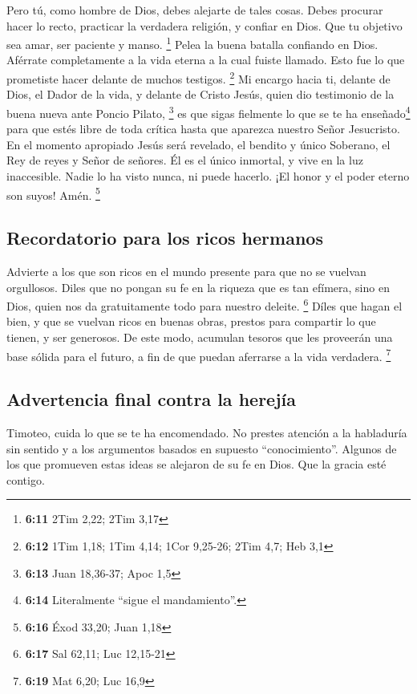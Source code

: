  Pero tú, como hombre de Dios, debes alejarte de tales
cosas. Debes procurar hacer lo recto, practicar la verdadera religión, y
confiar en Dios. Que tu objetivo sea amar, ser paciente y manso.
\footnote{\textbf{6:11} 2Tim 2,22; 2Tim 3,17}  Pelea la
buena batalla confiando en Dios. Aférrate completamente a la vida eterna
a la cual fuiste llamado. Esto fue lo que prometiste hacer delante de
muchos testigos. \footnote{\textbf{6:12} 1Tim 1,18; 1Tim 4,14; 1Cor
  9,25-26; 2Tim 4,7; Heb 3,1}  Mi encargo hacia ti,
delante de Dios, el Dador de la vida, y delante de Cristo Jesús, quien
dio testimonio de la buena nueva ante Poncio Pilato, \footnote{\textbf{6:13}
  Juan 18,36-37; Apoc 1,5}  es que sigas fielmente lo que
se te ha enseñado\footnote{\textbf{6:14} Literalmente ``sigue el
  mandamiento''.} para que estés libre de toda crítica hasta que
aparezca nuestro Señor Jesucristo.  En el momento
apropiado Jesús será revelado, el bendito y único Soberano, el Rey de
reyes y Señor de señores.  Él es el único inmortal, y
vive en la luz inaccesible. Nadie lo ha visto nunca, ni puede hacerlo.
¡El honor y el poder eterno son suyos! Amén. \footnote{\textbf{6:16}
  Éxod 33,20; Juan 1,18}

\hypertarget{recordatorio-para-los-ricos-hermanos}{%
\subsection{Recordatorio para los ricos
hermanos}\label{recordatorio-para-los-ricos-hermanos}}

 Advierte a los que son ricos en el mundo presente para
que no se vuelvan orgullosos. Diles que no pongan su fe en la riqueza
que es tan efímera, sino en Dios, quien nos da gratuitamente todo para
nuestro deleite. \footnote{\textbf{6:17} Sal 62,11; Luc 12,15-21}
 Díles que hagan el bien, y que se vuelvan ricos en
buenas obras, prestos para compartir lo que tienen, y ser generosos.
 De este modo, acumulan tesoros que les proveerán una
base sólida para el futuro, a fin de que puedan aferrarse a la vida
verdadera. \footnote{\textbf{6:19} Mat 6,20; Luc 16,9}

\hypertarget{advertencia-final-contra-la-herejuxeda}{%
\subsection{Advertencia final contra la
herejía}\label{advertencia-final-contra-la-herejuxeda}}

 Timoteo, cuida lo que se te ha encomendado. No prestes
atención a la habladuría sin sentido y a los argumentos basados en
supuesto ``conocimiento''.  Algunos de los que promueven
estas ideas se alejaron de su fe en Dios. Que la gracia esté contigo.

